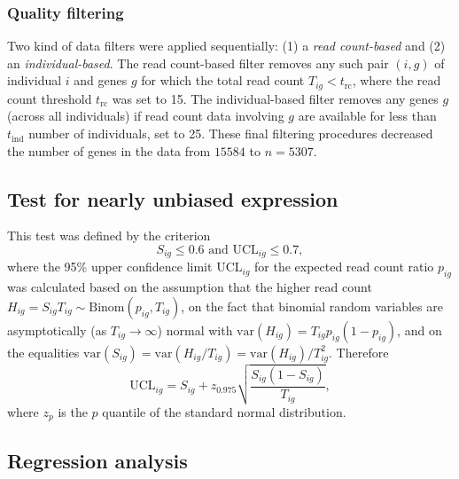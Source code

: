 \documentclass[letterpaper]{article}
\begin{document}

\subsubsection{Quality filtering}

\label{sec:filtering}

Two kind of data filters were applied sequentially: (1) a \emph{read
count-based} and (2) an \emph{individual-based}.  The read count-based filter
removes any such pair $(i,g)$ of individual $i$ and genes $g$ for which the
total read count $T_{ig}<t_\mathrm{rc}$, where the read count threshold
$t_\mathrm{rc}$ was set to 15. The individual-based filter removes any genes
$g$ (across all individuals) if read count data involving $g$ are available
for less than $t_\mathrm{ind}$ number of individuals, set to 25.
These final filtering procedures decreased the number of genes in the data from
\(15584\) to \(n=5307\).

\subsection{Test for nearly unbiased expression}

This test was defined by the criterion
\begin{equation}
S_{ig} \le 0.6 \text{ and } \mathrm{UCL}_{ig} \le 0.7,
\label{eq:unbiased-test}
\end{equation}
where the 95\% upper confidence limit \(\mathrm{UCL}_{ig}\) for the expected
read count ratio \(p_{ig}\) was calculated based on the assumption
that the higher read count \(H_{ig}=S_{ig}T_{ig}\sim \mathrm{Binom}(p_{ig},
T_{ig})\), on the fact that binomial random variables are
asymptotically (as \(T_{ig}\rightarrow \infty\)) normal with
\(\mathrm{var}(H_{ig}) = T_{ig}p_{ig}(1-p_{ig})\), and on the equalities
\(\mathrm{var}(S_{ig}) = \mathrm{var}(H_{ig}/T_{ig}) =
\mathrm{var}(H_{ig})/T_{ig}^2\).  Therefore
\begin{equation}
\mathrm{UCL}_{ig} = S_{ig} + z_{0.975} \sqrt{\frac{S_{ig} (1 - S_{ig})}{T_{ig}}},
\end{equation}
where $z_{p}$ is the $p$ quantile of the standard normal distribution.

\subsection{Regression analysis}
\label{sec:methods-regression}
\end{document}
